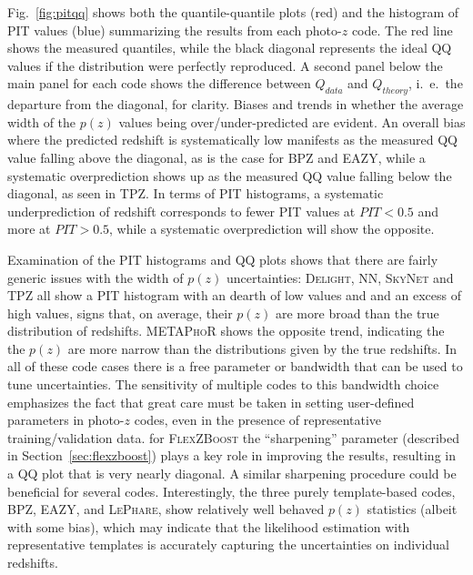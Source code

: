 Fig.~\ref{fig:pitqq} shows both the quantile-quantile plots (red) and the histogram of PIT values (blue) summarizing the results from each photo-$z$ code.  The red line shows the measured quantiles, while the black diagonal represents the ideal QQ values if the distribution were perfectly reproduced.  A second panel below the main panel for each code shows the difference between $Q_{data}$ and $Q_{theory}$, i.~e.~the departure from the diagonal, for clarity.
Biases and trends in whether the average width of the $p(z)$ values being over/under-predicted are evident.  An overall bias where the predicted redshift is systematically low manifests as the measured QQ value falling above the diagonal, as is the case for \textsc{BPZ} and \textsc{EAZY}, while a systematic overprediction shows up as the measured QQ value falling below the diagonal, as seen in \textsc{TPZ}.  In terms of PIT histograms, a systematic underprediction of redshift corresponds to fewer PIT values at $PIT<0.5$ and more at $PIT>0.5$, while a systematic overprediction will show the opposite.

Examination of the PIT histograms and QQ plots shows that there are fairly generic issues with the width of $p(z)$ uncertainties: \textsc{Delight, NN, SkyNet} and \textsc{TPZ} all show a PIT histogram with an dearth of low values and and an excess of high values, signs that, on average, their $p(z)$ are more broad than the true distribution of redshifts.  \textsc{METAPhoR} shows the opposite trend, indicating the the $p(z)$  are more narrow than the distributions given by the true redshifts.  In all of these code cases there is a free parameter or bandwidth that can be used to tune uncertainties.  The sensitivity of multiple codes to this bandwidth choice emphasizes the fact that great care must be taken in setting user-defined parameters in photo-$z$ codes, even in the presence of representative training/validation data.  for \textsc{FlexZBoost} the ``sharpening'' parameter (described in Section~\ref{sec:flexzboost}) plays a key role in improving the results, resulting in a QQ plot that is very nearly diagonal.  A similar sharpening procedure could be beneficial for several codes.
Interestingly, the three purely template-based codes, \textsc{BPZ, EAZY}, and \textsc{LePhare}, show relatively well behaved $p(z)$ statistics (albeit with some bias), which may indicate that the likelihood estimation with representative templates is accurately capturing the uncertainties on individual redshifts.

